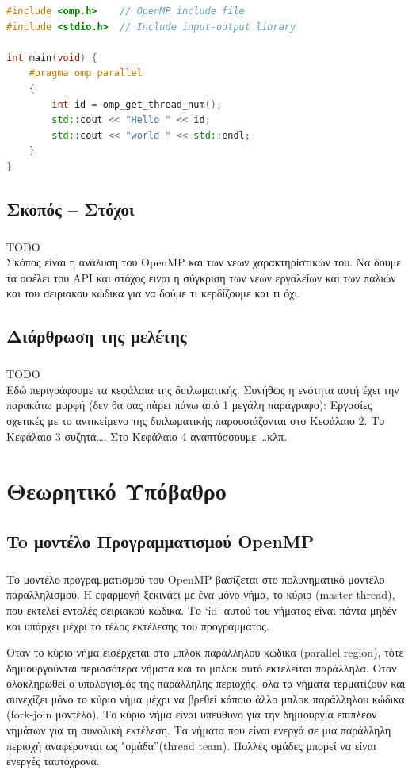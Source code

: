\documentclass[12pt]{article}
\newcommand{\en}[1]{\foreignlanguage{english}{#1}}
\newcommand{\el}[1]{\selectlanguage{greek}{#1}\selectlanguage{english}}
\begin{document}
\begin{lstlisting}[language=C++, caption={\el{Παράδειγμα παράλληλου κώδικα} OpenMP}, frame=tb]
#include <omp.h>    // OpenMP include file
#include <stdio.h>  // Include input-output library

int main(void) {
	#pragma omp parallel	
	{
		int id = omp_get_thread_num();
		std::cout << "Hello " << id;
		std::cout << "world " << std::endl;
	}
}
\end{lstlisting}



 \newpage
 \subsection{Σκοπός – Στόχοι}
\subparagraph{}
{\LARGE \en{TODO}}\\
Σκόπος είναι η ανάλυση του OpenMP και των νεων χαρακτηρίστικών του. Να δουμε τα οφέλει του API και στόχος 
ειναι η σύγκριση των νεων εργαλείων και των παλιών και του σειριακου κώδικα για να δούμε τι κερδίζουμε και τι όχι.

\subsection{Διάρθρωση της μελέτης}
\subparagraph{}
{\LARGE \en{TODO}}\\
Εδώ περιγράφουμε τα κεφάλαια της διπλωματικής. Συνήθως η ενότητα αυτή έχει την παρακάτω μορφή (δεν θα σας πάρει πάνω από 1 μεγάλη παράγραφο): Εργασίες σχετικές με το αντικείμενο της διπλωματικής παρουσιάζονται στο Κεφάλαιο 2. Το Κεφάλαιο 3 συζητά…. Στο Κεφάλαιο 4 αναπτύσσουμε …κλπ.

\clearpage
\section{Θεωρητικό Υπόβαθρο}
\subsection{To μοντέλο Προγραμματισμού \en{OpenMP}}
\subparagraph{}
Το μοντέλο προγραμματισμού του \en{OpenMP} βασίζεται στο πολυνηματικό μοντέλο παραλληλισμού.  Η εφαρμογή ξεκινάει με ένα μόνο νήμα, το κύριο (\en{master thread}), που εκτελεί εντολές σειριακού κώδικα. Το \en{‘id’} αυτού του νήματος είναι πάντα μηδέν και υπάρχει μέχρι το τέλος εκτέλεσης του προγράμματος\cite{pdplab}. 

Οταν το κύριο νήμα  εισέρχεται στο μπλοκ παράλληλου κώδικα (\en{parallel region}), τότε δημιουργούνται περισσότερα νήματα και το μπλοκ αυτό εκτελείται παράλληλα. Οταν ολοκληρωθεί ο υπολογισμός της παράλληλης περιοχής, όλα τα νήματα τερματίζουν και συνεχίζει μόνο το κύριο νήμα μέχρι να βρεθεί κάποιο άλλο μπλοκ παράλληλου κώδικα (\en{fork-join} μοντέλο)\cite{pdplab}. Το κύριο νήμα είναι υπεύθυνο για την δημιουργία επιπλέον νημάτων για τη συνολική εκτέλεση. Τα νήματα που είναι ενεργά σε μια παράλληλη περιοχή αναφέρονται ως \en{"}ομάδα”(\en{thread team}). Πολλές ομάδες μπορεί να είναι ενεργές ταυτόχρονα\cite{ompblaise}.
\end{document}

